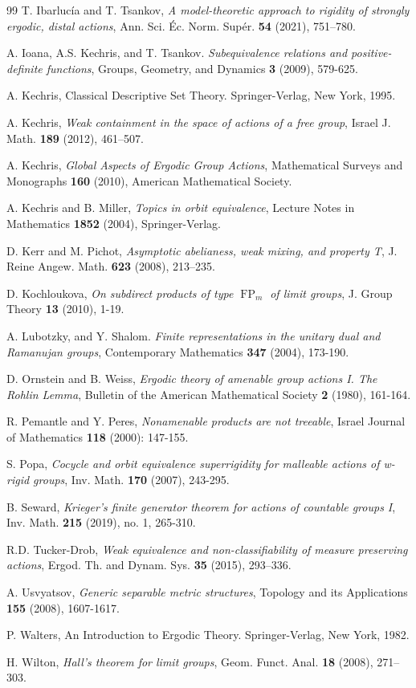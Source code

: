 \documentclass[12pt]{amsart}
\theoremstyle{definition}
\begin{document}
\begin{thebibliography}{99}
 T. Ibarluc\'ia and T. Tsankov, \emph{A model-theoretic approach to rigidity of strongly ergodic, distal actions}, Ann. Sci. Éc. Norm. Supér. \textbf{54} (2021), 751–780.

 A. Ioana, A.S. Kechris, and T. Tsankov. \emph{Subequivalence relations and positive-definite functions}, Groups, Geometry, and Dynamics \textbf{3} (2009), 579-625.

 A. Kechris, Classical Descriptive Set Theory. Springer-Verlag, New York, 1995.

 A. Kechris, \emph{Weak containment in the space of actions of a free group}, Israel J. Math. \textbf{189} (2012), 461–507.

 A. Kechris, \emph{Global Aspects of Ergodic Group Actions}, Mathematical Surveys and Monographs \textbf{160} (2010), American Mathematical Society.

 A. Kechris and B. Miller, \emph{Topics in orbit equivalence}, Lecture Notes in Mathematics \textbf{1852} (2004), Springer-Verlag.

 D. Kerr and M. Pichot, \emph{Asymptotic abelianess, weak mixing, and
property T}, J. Reine Angew. Math. \textbf{623} (2008), 213–235.

 D. Kochloukova, \emph{On subdirect products of type $\operatorname{FP}_m$ of limit groups}, J. Group Theory \textbf{13} (2010), 1-19.

 A. Lubotzky, and Y. Shalom. \emph{Finite representations in the unitary dual and Ramanujan groups}, Contemporary Mathematics \textbf{347} (2004), 173-190.

 D. Ornstein and B. Weiss, \emph{Ergodic theory of amenable group actions I. The Rohlin Lemma}, Bulletin of the American Mathematical Society \textbf{2} (1980), 161-164.

 R. Pemantle and Y. Peres, \emph{Nonamenable products are not treeable}, Israel Journal of Mathematics \textbf{118} (2000): 147-155.

 S. Popa, \emph{Cocycle and orbit equivalence superrigidity for malleable actions of w-rigid groups}, Inv. Math. \textbf{170} (2007), 243-295.

 B. Seward, \emph{Krieger's finite generator theorem for actions of countable groups I}, Inv. Math. \textbf{215} (2019), no. 1, 265-310.

 R.D. Tucker-Drob, \emph{Weak equivalence and non-classifiability of measure preserving actions}, Ergod. Th. and Dynam. Sys. \textbf{35} (2015), 293–336.

 A. Usvyatsov, \emph{Generic separable metric structures}, Topology and its Applications
\textbf{155} (2008), 1607-1617.

 P. Walters, An Introduction to Ergodic Theory. Springer-Verlag, New York, 1982.

 H. Wilton, \emph{Hall's theorem for limit groups}, Geom. Funct. Anal. \textbf{18} (2008), 271–303. 
\end{thebibliography}
\end{document}
